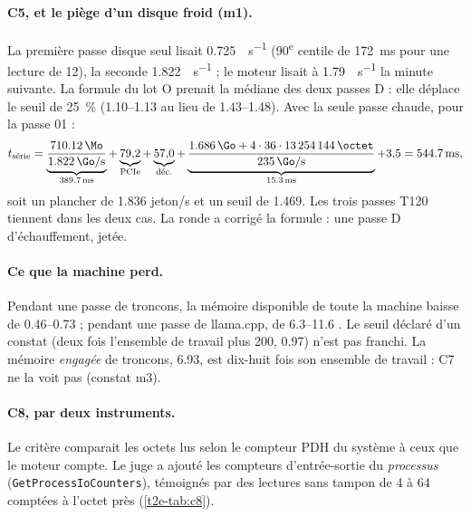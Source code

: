 \paragraph{C5, et le piège d'un disque froid (m1).} La première passe disque seul lisait \SI{0.725}{\Go\per\second} (90\textsuperscript{e} centile de \SI{172}{\milli\second} pour une lecture de \SI{12}{\Mo}), la seconde \SI{1.822}{\Go\per\second} ; le moteur lisait à \SI{1.79}{\Go\per\second} la minute suivante. La formule du lot O prenait la médiane des deux passes D : elle déplace le seuil de \SI{25}{\percent} (\numrange{1.10}{1.13} au lieu de \numrange{1.43}{1.48}). Avec la seule passe chaude, pour la passe 01 \calc :
\[
t_{\text{série}} = \underbrace{\frac{\SI{710.12}{\Mo}}{\SI{1.822}{\Go\per\second}}}_{\SI{389.7}{\milli\second}} + \underbrace{79{,}2}_{\text{PCIe}} + \underbrace{57{,}0}_{\text{déc.}} + \underbrace{\frac{\SI{1.686}{\Go} + 4 \cdot 36 \cdot \SI{13254144}{\octet}}{\SI{235}{\Go\per\second}}}_{\SI{15.3}{\milli\second}} + 3{,}5 = \SI{544.7}{\milli\second},
\]
soit un plancher de \num{1.836} jeton/s et un seuil de \num{1.469}. Les trois passes T120 tiennent dans les deux cas. La ronde a corrigé la formule : une passe D d'échauffement, jetée.

\paragraph{Ce que la machine perd.} Pendant une passe de troncons, la mémoire disponible de toute la machine baisse de \SIrange{0.46}{0.73}{\Go} ; pendant une passe de llama.cpp, de \SIrange{6.3}{11.6}{\Go} \mes. Le seuil déclaré d'un constat (deux fois l'ensemble de travail plus \SI{200}{\Mo}, \SI{0.97}{\Go}) n'est pas franchi. La mémoire \emph{engagée} de troncons, \SI{6.93}{\Go}, est dix-huit fois son ensemble de travail : C7 ne la voit pas (constat m3).

\paragraph{C8, par deux instruments.} Le critère comparait les octets lus selon le compteur PDH du système à ceux que le moteur compte. Le juge a ajouté les compteurs d'entrée-sortie du \emph{processus} (\texttt{GetProcessIoCounters}), témoignés par des lectures sans tampon de \SI{4}{\Kio} à \SI{64}{\Mio} comptées à l'octet près (\cref{t2e-tab:c8}).

